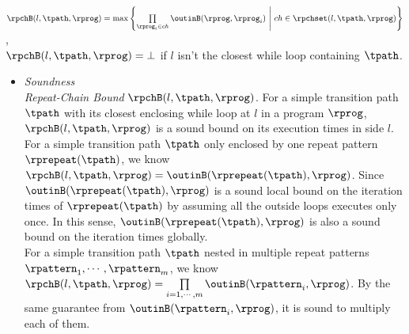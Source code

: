 \begin{enumerate}
\begin{enumerate}
  \\
  $\rpchB(l, \tpath, \rprog) = \max \left\{ \prod\limits_{\rprog_i \in ch}  \outinB(\rprog, \rprog_i) 
  ~\middle\vert~ ch \in \rpchset(l, \tpath, \rprog) \right\}
  $,
  \\
  $\rpchB(l, \tpath, \rprog) = \bot$ if $l$ isn't the closest while loop containing $\tpath$.
  \end{enumerate}
  \begin{itemize}
  \item 
  \emph{Soundness}
  \\
  \emph{Repeat-Chain Bound}  $\rpchB(l, \tpath, \rprog)$.
  For a simple transition path $\tpath$ with its closest enclosing while loop at $l$ in a program $\rprog$, $\rpchB(l, \tpath, \rprog)$
  is a sound bound on its execution times in side $l$.
  \\
  For a simple transition path $\tpath$ only enclosed by one repeat pattern $\rprepeat(\tpath)$, 
  we know $\rpchB(l, \tpath, \rprog) = \outinB(\rprepeat(\tpath), \rprog)$.
  Since $\outinB(\rprepeat(\tpath), \rprog)$ is a sound local bound on the iteration times
  of $\rprepeat(\tpath)$ by assuming all the outside loops executes only once.
  In this sense, $\outinB(\rprepeat(\tpath), \rprog)$ is also a sound bound on the iteration times globally.
  \\
  For a simple transition path $\tpath$ nested in multiple repeat patterns $\rpattern_1, \cdots, \rpattern_m$,
  we know $\rpchB(l, \tpath, \rprog) = \prod\limits_{i = 1, \cdots, m}\outinB(\rpattern_i, \rprog)$.
  By the same guarantee from $\outinB(\rpattern_i, \rprog)$, it is sound to multiply each of them.
  

\end{itemize}
\end{enumerate}
